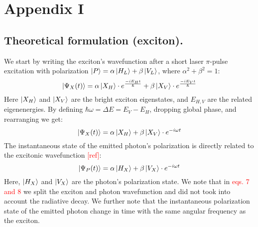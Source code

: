 \section{Appendix I}\label{appendix1}
\subsection*{Theoretical formulation (exciton).}
We start by writing the exciton's wavefunction after a short laser $\pi$-pulse excitation with polarization $\ket{P}=\alpha\ket{H_L}+\beta\ket{V_L}$, where $\alpha^2+\beta^2=1$:
\begin{equation}
	\ket{\Psi_X(t)} = \alpha\ket{X_H}\cdot e^{\frac{-iE_H t}{\hslash}}+\beta\ket{X_V}\cdot e^{\frac{-iE_Vt}{\hslash}}
\end{equation}
Here $\ket{X_H}$ and $\ket{X_V}$ are the bright exciton eigenstates, and $E_{H,V}$ are the related eigenenergies.
By defining $\hbar\omega=\Delta E=E_V-E_H$, dropping global phase, and rearranging we get:
\begin{equation}
	\ket{\Psi_X(t)} = \alpha\ket{X_H} + \beta\ket{X_V}\cdot e^{-i\omega t}
\end{equation}
The instantaneous state of the emitted photon's polarization is directly related to the excitonic wavefunction \textcolor{red}{[ref]}:
\begin{equation}
	\ket{\Psi_P(t)} = \alpha\ket{H_X}+\beta\ket{V_X}\cdot e^{-i\omega t}
\end{equation}
Here, $\ket{H_X}$ and $\ket{V_X}$ are the photon's polarization state.
We note that in \textcolor{red}{eqs. 7 and 8} we split the exciton and photon wavefunction and did not took into account the radiative decay.
We further note that the instantaneous polarization state of the emitted photon change in time with the same angular frequency as the exciton.


